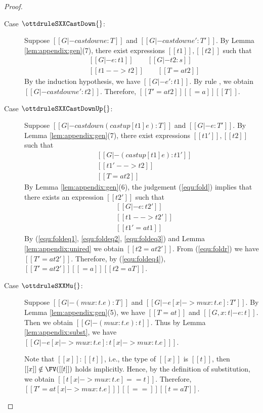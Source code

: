 \begin{proof}
\begin{description}
        \item[Case $\ottdruleSXXCastDown{}$:] $\quad$ \\
        Suppose $[[G |- castdown e :T]]$ and $[[G |- castdown e' :T']]$. By
Lemma \ref{lem:appendix:gen}(7), there exist expressions $[[t1]], [[t2]]$ such
that 
        \begin{align*}
            &[[G |- e:t1]] \qquad [[G |- t2:s]] \\
            &[[t1 --> t2]] \qquad [[T =a t2 ]]
        \end{align*}
        By the induction hypothesis, we have $[[G |- e':t1]]$. By rule
, we obtain $[[G |- castdown e' : t2 ]]$. Therefore, $[[T'
=a t2]] [[=a]] [[T]]$.
        
        \item[Case $\ottdruleSXXCastDownUp{}$:] $\quad$ \\
        Suppose $[[G |- castdown (castup [t1] e) :T]]$ and $[[G |- e :T']]$. By
Lemma \ref{lem:appendix:gen}(7), there exist expressions $[[t1']], [[t2]]$ such
that 
        \begin{align}
            &[[G |- (castup [t1] e):t1']] \label{equ:fold} \\
            &[[t1' --> t2]] \label{equ:foldeq1} \\
            &[[T =a t2 ]] \label{equ:foldeq4}
        \end{align}
        By Lemma \ref{lem:appendix:gen}(6), the judgement (\ref{equ:fold})
implies that there exists an expression $[[t2']]$ such that
        \begin{align}
            &[[G |- e:t2']] \label{equ:foldr} \\
            &[[t1 --> t2']] \label{equ:foldeq2} \\
            &[[t1' =a t1]] \label{equ:foldeq3}
        \end{align}
        By (\ref{equ:foldeq1}, \ref{equ:foldeq2}, \ref{equ:foldeq3}) and Lemma
\ref{lem:appendix:unired} we obtain $[[t2 =a t2']]$. From (\ref{equ:foldr}) we
have $[[T' =a t2' ]]$. Therefore, by (\ref{equ:foldeq4}), $[[T' =a t2' ]]
[[=a]] [[t2 =a T]]$.
        
        \item[Case $\ottdruleSXXMu{}$:] $\quad$ \\
        Suppose $[[G |- (mu x:t.e) :T]]$ and $[[G |- e[x |-> mu x:t.e] :T']]$.
By Lemma \ref{lem:appendix:gen}(5), we have $[[T =a t]]$ and $[[G, x:t |-
e:t]]$. Then we obtain $[[G |- (mu x:t.e) : t]]$. Thus by Lemma
\ref{lem:appendix:subst}, we have $[[G |- e[x |-> mu x:t.e] : t[x |-> mu x:t.e]
]]$.
        
        Note that $[[x]]:[[t]]$, i.e., the type of $[[x]]$ is $[[t]]$, then
$[[x]] \notin \FV([[t]])$ holds implicitly. Hence, by the definition of
substitution, we obtain $[[t[x |-> mu x:t.e] == t]]$. Therefore, $[[T' =a t[x
|-> mu x:t.e] ]] [[==]] [[t =a T]]$.
    \end{description}
\end{proof}

